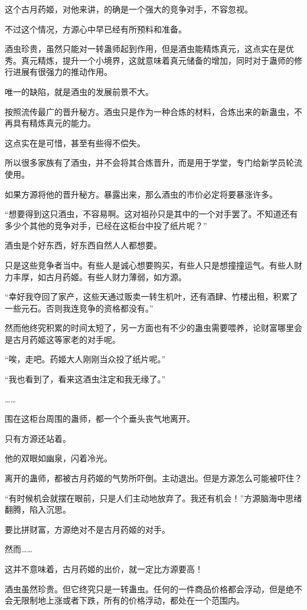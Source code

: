 \begin{this_body}
这个古月药姬，对他来讲，的确是一个强大的竞争对手，不容忽视。

不过这个情况，方源心中早已经有所预料和准备。

酒虫珍贵，虽然只能对一转蛊师起到作用，但是酒虫能精炼真元，这点实在是优秀。真元精炼，提升一个小境界，这就意味着真元储备的增加，同时对于蛊师的修行进展有很强力的推动作用。

唯一的缺陷，就是酒虫的发展前景不大。

按照流传最广的晋升秘方。酒虫只是作为一种合炼的材料，合炼出来的新蛊虫，不再具有精炼真元的能力。

这点实在是可惜，甚至有些得不偿失。

所以很多家族有了酒虫，并不会将其合炼晋升，而是用于学堂，专门给新学员轮流使用。

如果方源将他的晋升秘方。暴露出来，那么酒虫的市价必定将要暴涨许多。

“想要得到这只酒虫，不容易啊。这对祖孙只是其中的一个对手罢了。不知道还有多少个其他的竞争对手，已经在这柜台中投了纸片呢？”

酒虫是个好东西，好东西自然人人都想要。

只是这些竞争者当中。有些人是诚心想要购买，有些人只是想撞撞运气。有些人财力丰厚，如古月药姬。有些人财力薄弱，如方源。

“幸好我夺回了家产，这些天通过贩卖一转生机叶，还有酒肆、竹楼出租，积累了一些元石。否则我连竞争的资格都没有。”

然而他终究积累的时间太短了，另一方面也有不少的蛊虫需要喂养，论财富哪里会是古月药姬这等家老的对手呢。

“唉，走吧。药姬大人刚刚当众投了纸片呢。”

“我也看到了，看来这酒虫注定和我无缘了。”

……

围在这柜台周围的蛊师，都一个个垂头丧气地离开。

只有方源还站着。

他的双眼如幽泉，闪着冷光。

离开的蛊师，都被古月药姬的气势所吓倒。主动退出。但是方源怎么可能被吓住？

“有时候机会就摆在眼前，只是人们主动地放弃了。我还有机会！”方源脑海中思绪翻腾，陷入沉思。

要比拼财富，方源绝对不是古月药姬的对手。

然而……

这并不意味着，古月药姬的出价，就一定比方源要高！

酒虫虽然珍贵。但它终究只是一转蛊虫。任何的一件商品价格都会浮动，但是绝不会无限制地上涨或者下跌，所有的价格浮动，都处在一个范围内。


\end{this_body}
